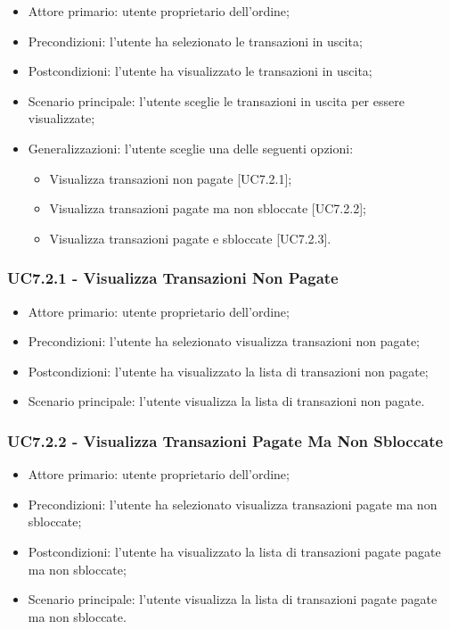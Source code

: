 \begin{itemize}
    \item Attore primario: utente proprietario dell'ordine;
    \item Precondizioni: l'utente ha selezionato le transazioni in uscita;
    \item Postcondizioni: l'utente ha visualizzato le transazioni in uscita;
    \item Scenario principale: l'utente sceglie le transazioni in uscita per essere visualizzate;
    \item Generalizzazioni: l'utente sceglie una delle seguenti opzioni:
          \begin{itemize}
              \item Visualizza transazioni non pagate [UC7.2.1];
              \item Visualizza transazioni pagate ma non sbloccate [UC7.2.2];
              \item Visualizza transazioni pagate e sbloccate [UC7.2.3].
          \end{itemize}
\end{itemize}

\subsubsection{UC7.2.1 - Visualizza Transazioni Non Pagate}

\begin{itemize}
    \item Attore primario: utente proprietario dell'ordine;
    \item Precondizioni: l'utente ha selezionato visualizza transazioni non pagate;
    \item Postcondizioni: l'utente ha visualizzato la lista di transazioni non pagate;
    \item Scenario principale: l'utente visualizza la lista di transazioni non pagate.
\end{itemize}

\subsubsection{UC7.2.2 - Visualizza Transazioni Pagate Ma Non Sbloccate}

\begin{itemize}
    \item Attore primario: utente proprietario dell'ordine;
    \item Precondizioni: l'utente ha selezionato visualizza transazioni pagate ma non sbloccate;
    \item Postcondizioni: l'utente ha visualizzato la lista di transazioni pagate pagate ma non sbloccate;
    \item Scenario principale: l'utente visualizza la lista di transazioni pagate pagate ma non sbloccate.
\end{itemize}

